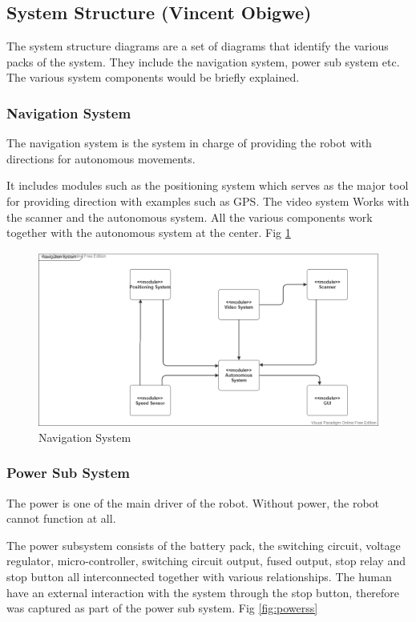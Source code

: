 \documentclass[10pt,journal,compsoc]{IEEEtran}
\begin{document}
\subsection{System Structure (Vincent  Obigwe)}

The system structure diagrams are a set of diagrams that identify the various packs of the system. They include the navigation system, power sub system etc. The various system components would be briefly explained. 

\subsubsection{Navigation System}

The navigation system is the system in charge of providing the robot with directions for autonomous movements.

It includes modules such as the positioning system which serves as the major tool for providing direction with examples such as GPS. The video system Works with the scanner and the autonomous system. All the various components work together with the autonomous system at the center. Fig \ref{fig:navigation}

\begin{figure}[h]
\includegraphics[scale=0.25]{navigation}
\caption{Navigation System}
\label{fig:navigation}
\end{figure}

\subsubsection{Power Sub System}

The power is one of the main driver of the robot. Without power, the robot cannot function at all. 

The power subsystem consists of the battery pack, the switching circuit, voltage regulator, micro-controller, switching circuit output, fused output, stop relay and stop button all interconnected together with various relationships. The human have an external interaction with the system through the stop button, therefore was captured as part of the power sub system. Fig \ref{fig:powerss}
\end{document}
